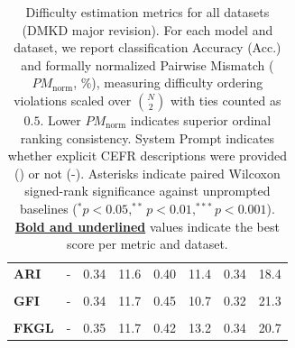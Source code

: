 \begin{table}[!htbp]
\begin{tabular}{lccccccc}
        \\[2pt]
        \textbf{ARI} & - & 0.34 & 11.6 & 0.40 & 11.4 & 0.34 & 18.4 \\
        \\[2pt]
        \textbf{GFI} & - & 0.34 & 11.7 & 0.45 & 10.7 & 0.32 & 21.3 \\
        \\[2pt]
        \textbf{FKGL} & - & 0.35 & 11.7 & 0.42 & 13.2 & 0.34 & 20.7 \\
        \bottomrule
    \end{tabular}
    \caption{Difficulty estimation metrics for all datasets (DMKD major revision). For each model and dataset, we report classification Accuracy (Acc.) and formally normalized Pairwise Mismatch ($PM_{\text{norm}}$, \%), measuring difficulty ordering violations scaled over $\binom{N}{2}$ with ties counted as $0.5$. Lower $PM_{\text{norm}}$ indicates superior ordinal ranking consistency. System Prompt indicates whether explicit CEFR descriptions were provided (\checkmark) or not (-). Asterisks indicate paired Wilcoxon signed-rank significance against unprompted baselines ($^{*}p<0.05, ^{**}p<0.01, ^{***}p<0.001$). \textbf{\underline{Bold and underlined}} values indicate the best score per metric and dataset.}
    \label{tab:difficulty_estimation_metrics}
\end{table}

